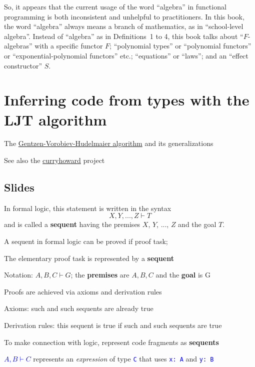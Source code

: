 So, it appears that the current usage of the word ``algebra'' in
functional programming is both inconsistent and unhelpful to practitioners.
In this book, the word ``algebra'' always means a branch of mathematics,
as in ``school-level algebra''. Instead of ``algebra'' as in Definitions~1
to 4, this book talks about ``$F$-algebras'' with a specific functor
$F$; ``polynomial types'' or ``polynomial functors'' or ``exponential-polynomial
functors'' etc.; ``equations'' or ``laws''; and an ``effect
constructor'' $S$.

\chapter{Inferring code from types with the LJT algorithm\label{app:CH-correspondence-LJT-algorithm}}

The \href{http://apt13.unibe.ch/slides/Dyckhoff.pdf}{Gentzen-Vorobiev-Hudelmaier algorithm}
and its generalizations

See also the \href{https://github.com/Chymyst/curryhoward}{curryhoward}
project

\section{Slides}

In formal logic, this statement is written in the syntax
\[
X,Y,...,Z\vdash T
\]
and is called a \textbf{sequent} having
the premises $X$, $Y$, ..., $Z$ and the goal $T$.

A sequent in formal logic can be proved if proof task;

The elementary proof task is represented by a \textbf{sequent}

Notation: $A,B,C\vdash G$; the \textbf{premises} are $A,B,C$ and
the \textbf{goal} is G

Proofs are achieved via axioms and derivation rules

Axioms: such and such sequents are already true

Derivation rules: this sequent is true if such and such sequents are
true

To make connection with logic, represent code fragments as \textbf{sequents}

\textcolor{blue}{$A,B\vdash C$} represents an \emph{expression} of
type \texttt{\textcolor{blue}{\footnotesize{}C}} that uses \texttt{\textcolor{blue}{\footnotesize{}x:\ A}}
and \texttt{\textcolor{blue}{\footnotesize{}y:\ B}}{\footnotesize\par}

